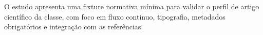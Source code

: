 O estudo apresenta uma fixture normativa mínima para validar o perfil de artigo científico da classe, com foco em fluxo contínuo, tipografia, metadados obrigatórios e integração com as referências.

